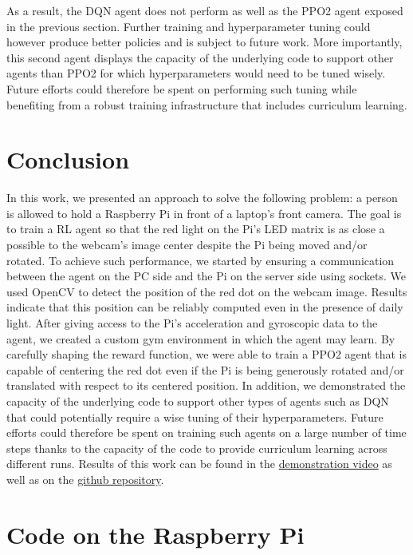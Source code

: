 As a result, the DQN agent does not perform as well as the PPO2 agent exposed in the previous section.  Further training and hyperparameter tuning could however produce better policies and is subject to future work. More importantly, this second agent displays the capacity of the underlying code to support other agents than PPO2 for which hyperparameters would need to be tuned wisely. Future efforts could therefore be spent on performing such tuning while benefiting from a robust training infrastructure that includes curriculum learning.

\section{Conclusion}

In this work, we presented an approach to solve the following problem: a person is allowed to hold a Raspberry Pi in front of a laptop's front camera. The goal is to train a RL agent so that the red light on the Pi's LED matrix is as close a possible to the webcam's image center despite the Pi being moved and/or rotated. To achieve such performance, we started by ensuring a communication between the agent on the PC side and the Pi on the server side using sockets. We used OpenCV to detect the position of the red dot on the webcam image. Results indicate that this position can be reliably computed even in the presence of daily light. After giving access to the Pi's acceleration and gyroscopic data to the agent, we created a custom gym environment in which the agent may learn. By carefully shaping the reward function, we were able to train a PPO2 agent that is capable of centering the red dot even if the Pi is being generously rotated and/or translated with respect to its centered position. In addition, we demonstrated the capacity of the underlying code to support other types of agents such as DQN that could potentially require a wise tuning of their hyperparameters. Future efforts could therefore be spent on training such agents on a large number of time steps thanks to the capacity of the code to provide curriculum learning across different runs.  Results of this work can be found in the \href{https://youtu.be/VGtoMPvjIwM}{demonstration video} as well as on the \href{https://github.com/avdhoeke/robotics}{github repository}.


\section{Code on the Raspberry Pi}

